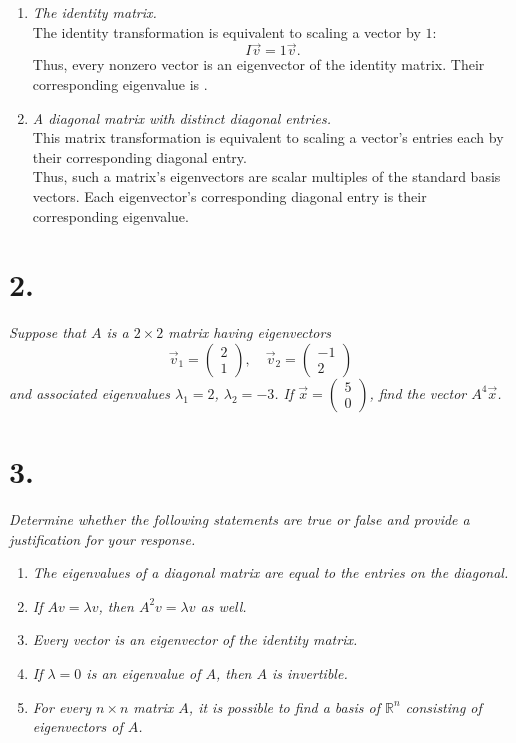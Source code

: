 \documentclass[12pt]{article}
\begin{document}
\begin{enumerate}[label=(\alph*)]
	\item \textit{The identity matrix.} \\[\baselineskip]
	The identity transformation is equivalent to scaling a vector by $1$:
	\begin{equation*}
		I \vec{v} = 1 \vec{v}.
	\end{equation*}
	Thus, every nonzero vector is an eigenvector of the identity matrix. Their
	corresponding eigenvalue is .
	
	\item \textit{A diagonal matrix with distinct diagonal entries.}
	\\[\baselineskip]
	This matrix transformation is equivalent to scaling a vector's entries
	each by their corresponding diagonal entry. \\
	Thus, such a matrix's eigenvectors are scalar multiples of the standard
	basis vectors. Each eigenvector's corresponding diagonal entry is their
	corresponding eigenvalue.
\end{enumerate}

\section*{2.}
\textit{Suppose that $A$ is a $2 \times 2$ matrix having eigenvectors}
\begin{equation*}
	\vec{v}_1 = \begin{pmatrix} 2 \\ 1 \end{pmatrix}, \quad
	\vec{v}_2 = \begin{pmatrix} -1 \\ 2 \end{pmatrix}
\end{equation*}
\textit{and associated eigenvalues $\lambda_1 = 2$, $\lambda_2 = -3$. If
$\vec{x} = \begin{pmatrix} 5 \\ 0 \end{pmatrix}$, find the vector
$A^4 \vec{x}$.}

\section*{3.}
\textit{Determine whether the following statements are true or false and
provide a justification for your response.}
\begin{enumerate}[label=(\alph*)]
	\item \textit{The eigenvalues of a diagonal matrix are equal to the
	entries on the diagonal.}
	\item \textit{If $A v = \lambda v$, then $A^2 v = \lambda v$ as well.}
	\item \textit{Every vector is an eigenvector of the identity matrix.}
	\item \textit{If $\lambda = 0$ is an eigenvalue of $A$, then $A$ is
	invertible.}
	\item \textit{For every $n \times n$ matrix $A$, it is possible to find
	a basis of $\mathbb{R}^n$ consisting of eigenvectors of $A$.}
\end{enumerate}
\end{document}
